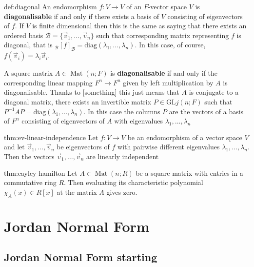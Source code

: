 \documentclass{article}
\DeclareMathOperator{\Mat}{Mat}
\begin{document}
\begin{dfn}[Diagonalisability]{def:diagonal}{}
    An endomorphism $f : V \to V$ of an $F$-vector space $V$ is \textbf{diagonalisable} if and only if there exists a basis of $V$ consisting of eigenvectors of $f$. If $V$ is finite dimensional then this is the same as saying that there exists an ordered basis $\mathcal{B} = \{\vec{v}_{1},\dots,\vec{v}_{n}\}$ such that corresponding matrix representing $f$ is diagonal, that is $_{\mathcal{B}}[f]_{\mathcal{B}} = \text{diag}(\lambda_{1},\dots,\lambda_{n})$. In this case, of course, $f(\vec{v}_{i}) = \lambda_{i}\vec{v}_{i}$.
    
    A square matrix $A\in \Mat(n;F)$ is \textbf{diagonalisable} if and only if the corresponding linear mapping $F^{n}\to F^{n}$ given by left multiplication by $A$ is diagonalisable. Thanks to [something] this just means that $A$ is conjugate to a diagonal matrix, there exists an invertible matrix $P \in \text{GL}j(n;F)$ such that $P^{-1}AP = \text{diag}(\lambda_{1},\dots,\lambda_{n})$. In this case the columns $P$ are the vectors of a basis of $F^{n}$ consisting of eigenvectors of $A$ with eigenvalues $\lambda_{1},\dots,\lambda_{n}$
\end{dfn}

\newpage
\begin{thm}{thm:ev-linear-independence}{}
    Let $f : V\to V$ be an endomorphism of a vector space $V$ and let $\vec{v}_{1},\dots,\vec{v}_{n}$ be eigenvectors of $f$ with pairwise different eigenvalues $\lambda_{1},\dots,\lambda_{n}$. Then the vectors $\vec{v}_{1},\dots,\vec{v}_{n}$ are linearly independent
\end{thm}

\begin{thm}{thm:cayley-hamilton}{}
    Let $A\in \Mat(n;R)$ be a square matrix with entries in a commutative ring $R$. Then evaluating its characteristic polynomial $\chi_{A}(x)\in R[x]$ at the matrix $A$ gives zero.
\end{thm}


\newpage
\section{Jordan Normal Form}

\subsection{Jordan Normal Form starting}
\end{document}
